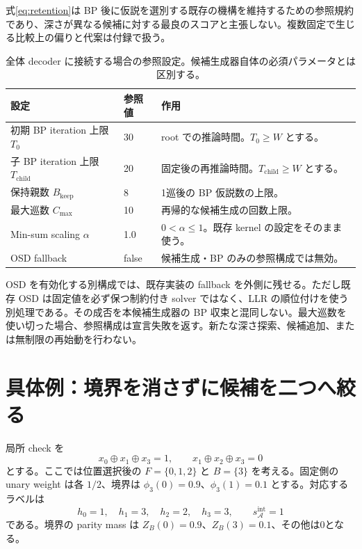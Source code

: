 \documentclass[a4paper,11pt]{ltjsarticle}
\numberwithin{equation}{section}
\theoremstyle{definition}
\newcommand{\A}{\mathcal A}
\begin{document}
式\eqref{eq:retention}は BP 後に仮説を選別する既存の機構を維持するための参照規約であり、深さが異なる候補に対する最良のスコアと主張しない。複数固定で生じる比較上の偏りと代案は付録で扱う。

\begin{table}[H]
\centering\small
\caption{全体 decoder に接続する場合の参照設定。候補生成器自体の必須パラメータとは区別する。}
\begin{tabular}{@{}p{50mm}p{22mm}p{80mm}@{}}
\toprule
設定 & 参照値 & 作用 \\
\midrule
初期 BP iteration 上限 $T_0$ & 30 & root での推論時間。$T_0\ge W$ とする。\\
子 BP iteration 上限 $T_{\mathrm{child}}$ & 20 & 固定後の再推論時間。$T_{\mathrm{child}}\ge W$ とする。\\
保持親数 $B_{\mathrm{keep}}$ & 8 & 1巡後の BP 仮説数の上限。\\
最大巡数 $C_{\max}$ & 10 & 再帰的な候補生成の回数上限。\\
Min-sum scaling $\alpha$ & 1.0 & $0<\alpha\le1$。既存 kernel の設定をそのまま使う。\\
OSD fallback & false & 候補生成・BP のみの参照構成では無効。\\
\bottomrule
\end{tabular}
\end{table}

OSD を有効化する別構成では、既存実装の fallback を外側に残せる。ただし既存 OSD は固定値を必ず保つ制約付き solver ではなく、LLR の順位付けを使う別処理である\cite{repo}。その成否を本候補生成器の BP 収束と混同しない。最大巡数を使い切った場合、参照構成は宣言失敗を返す。新たな深さ探索、候補追加、または無制限の再始動を行わない。

\section{具体例：境界を消さずに候補を二つへ絞る}
局所 check を
\begin{equation}
 x_0\oplus x_1\oplus x_3=1,\qquad
 x_1\oplus x_2\oplus x_3=0
 \label{eq:example}
\end{equation}
とする。ここでは位置選択後の $F=\{0,1,2\}$ と $B=\{3\}$ を考える。固定側の unary weight は各 $1/2$、境界は $\phi_3(0)=0.9$、$\phi_3(1)=0.1$ とする。対応するラベルは
\begin{equation}
 h_0=1,\quad h_1=3,\quad h_2=2,\quad h_3=3,
 \qquad s_\A^{\mathrm{int}}=1
\end{equation}
である。境界の parity mass は $Z_B(0)=0.9$、$Z_B(3)=0.1$、その他は0となる。
\end{document}
